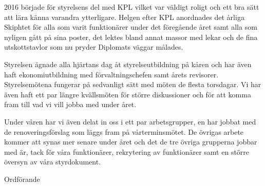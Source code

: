 \documentclass[../_main/handlingar.tex]{subfiles}
\begin{document}

2016 började för styrelsens del med KPL vilket var väldigt roligt och ett bra sätt att lära känna varandra ytterligare. Helgen efter KPL anordnades det årliga Skiphtet för alla som varit funktionärer under det föregående året samt alla som nyligen gått på sina poster, det lektes bland annat massor med lekar och de fina utskottstavlor som nu pryder Diplomats väggar målades.

Styrelsen ägnade alla hjärtans dag åt styrelseutbildning på kåren och har även haft ekonomiutbildning med förvaltningschefen samt årets revisorer. Styrelsemötena fungerar på sedvanligt sätt med möten de flesta torsdagar. Vi har även haft ett par längre kvällsmöten för större diskussioner och för att komma fram till vad vi vill jobba med under året.

Under våren har vi även delat in oss i ett par arbetsgrupper, en har jobbat med de renoveringsförslag som läggs fram på vårterminsmötet. De övrigas arbete kommer att synas mer senare under året och det de tre övriga grupperna jobbar med är, tack för våra funktionärer, rekrytering av funktionärer samt en större översyn av våra styrdokument.

\begin{signatures}{1}
    \mvh
    \signature{Fredrik Peterson}{Ordförande}
\end{signatures}
\end{document}
